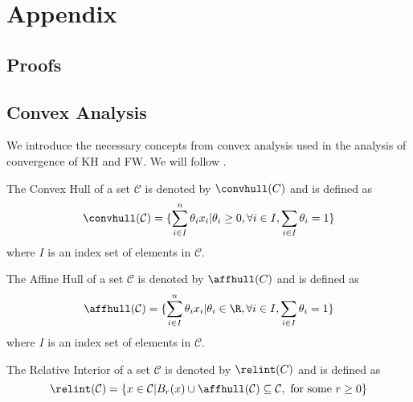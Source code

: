 \chapter{Appendix}

\section{Proofs}
\label{sec:appendix-proofs}

\section{Convex Analysis}
We introduce the necessary concepts from convex analysis used in the analysis of
convergence of KH and FW. We will follow \cite{boyd04_convex}.

\begin{definition}
  \label{def:conv-hull}
  The Convex Hull of a set \(\mathcal{C}\) is denoted by \(\convhull(C)\) and is defined as
  \begin{equation}
    \label{eq:conv-hull}
    \convhull(\mathcal{C}) = \{ \sum_{i \in I}^n \theta_{i} x_i | \theta_i \geq 0, \forall i \in I, \sum_{i \in I} \theta_i = 1 \}
  \end{equation}
  where \(I\) is an index set of elements in \(\mathcal{C}\).
\end{definition}

\begin{definition}
  \label{def:aff-hull}
  The Affine Hull of a set \(\mathcal{C}\) is denoted by \(\affhull(C)\) and is defined as
  \begin{equation}
    \label{eq:aff-hull}
    \affhull(\mathcal{C}) = \{ \sum_{i \in I}^n \theta_{i} x_i | \theta_i \in \R, \forall i \in I, \sum_{i \in I} \theta_i = 1 \}
  \end{equation}
  where \(I\) is an index set of elements in \(\mathcal{C}\).
\end{definition}

\begin{definition}
  \label{def:relative-interior}
  The Relative Interior of a set \(\mathcal{C}\) is denoted by \(\relint(C)\) and is defined as
  \begin{equation}
    \label{eq:relative-interior}
    \relint(\mathcal{C}) = \{x \in \mathcal{C} | B_{r}(x) \cup \affhull(\mathcal{C}) \subseteq \mathcal{C}, \text{ for some } r \geq 0\}
  \end{equation}
\end{definition}

